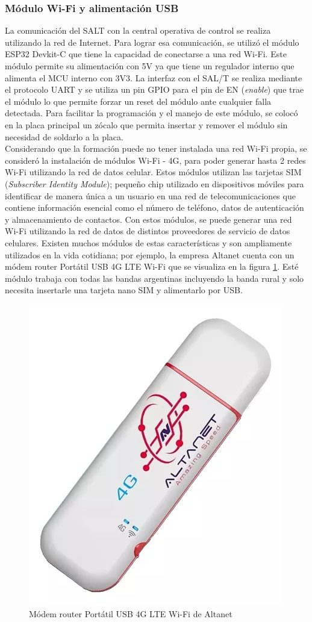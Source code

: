 \subsubsection{Módulo Wi-Fi y alimentación USB}


La comunicación del SALT con la central operativa de control se realiza utilizando la red de Internet. Para lograr esa comunicación, se utilizó el módulo ESP32 Devkit-C que tiene la capacidad de conectarse a una red Wi-Fi. Este módulo permite su alimentación con 5V ya que tiene un regulador interno que alimenta el MCU interno con 3V3. La interfaz con el SAL/T se realiza mediante el protocolo UART y se utiliza un pin GPIO para el pin de EN (\textit{enable}) que trae el módulo lo que permite forzar un reset del módulo ante cualquier falla detectada. Para facilitar la programación y el manejo de este módulo, se colocó en la placa principal un zócalo que permita insertar y remover el módulo sin necesidad de soldarlo a la placa. \\




Considerando que la formación puede no tener instalada una red Wi-Fi propia, se consideró la instalación de módulos Wi-Fi - 4G, para poder generar hasta 2 redes Wi-Fi utilizando la red de datos celular. Estos módulos utilizan las tarjetas SIM (\textit{Subscriber Identity Module}); pequeño chip utilizado en dispositivos móviles para identificar de manera única a un usuario en una red de telecomunicaciones que contiene información esencial como el número de teléfono, datos de autenticación y almacenamiento de contactos. Con estos módulos, se puede generar una red Wi-Fi utilizando la red de datos de distintos proveedores de servicio de datos celulares. Existen muchos módulos de estas características y son ampliamente utilizados en la vida cotidiana; por ejemplo, la empresa Altanet cuenta con un módem router Portátil USB 4G LTE Wi-Fi \cite{altanet} que se visualiza en la figura \ref{fig:mod_4g}. Esté módulo trabaja con todas las bandas argentinas incluyendo la banda rural y solo necesita insertarle una tarjeta nano SIM y alimentarlo por USB. 

\begin{figure}[H]
    \centering
    \includegraphics[width = 0.3\linewidth]{img/mod_4g.png}
    \caption{Módem router Portátil USB 4G LTE Wi-Fi de Altanet}
    \label{fig:mod_4g}
\end{figure}    


